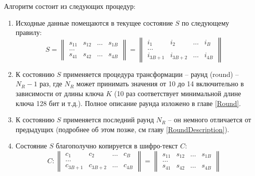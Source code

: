     Алгоритм состоит из следующих процедур:
    \begin{enumerate}
        \item Исходные данные помещаются в текущее состояние $S$ по следующему правилу:
            \begin{equation}
                S =
                \begin{Vmatrix}
                    s_{11} & s_{12} & \dots & s_{1B} \\
                    \dots \\
                    s_{41} & s_{42} & \dots & s_{4B}
                \end{Vmatrix} =
                \begin{Vmatrix}
                    i_{1} & i_{2} & \dots & i_{B} \\
                    \dots \\
                    i_{3B + 1} & i_{3B + 2} & \dots & i_{4B}
                \end{Vmatrix}
            \end{equation}

        \item К состоянию $S$ применяется процедура трансформации -- раунд (round) --  $N_R - 1$ раз,
        где $N_R$ может принимать значения от 10 до 14 включительно в зависимости от длины ключа $K$
        (10 раз соответствует минимальной длине ключа 128 бит и т.д.). Полное описание раунда
        изложено в главе \ref{Round}.

        \item К состоянию $S$ применяется последний раунд $N_R$ -- он немного отличается от предыдущих
        (подробнее об этом позже, см главу \ref{RoundDescription}).

        \item Состояние $S$ благополучно копируется в шифро-текст $C$:
        \begin{equation}
            C:
            \begin{Vmatrix}
                c_{1} & c_{2} & \dots & c_{B} \\
                \dots \\
                c_{3B + 1} & c_{3B + 2} & \dots & c_{4B}
            \end{Vmatrix} =
            \begin{Vmatrix}
                s_{11} & s_{12} & \dots & s_{1B} \\
                \dots \\
                s_{41} & s_{42} & \dots & s_{4B}
            \end{Vmatrix}
        \end{equation}
    \end{enumerate}


